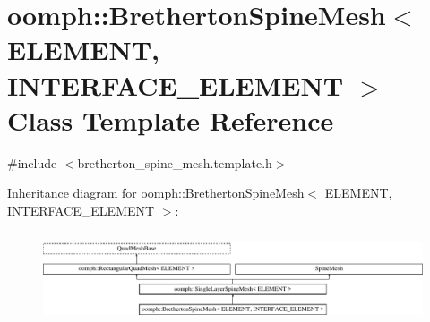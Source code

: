 \hypertarget{classoomph_1_1BrethertonSpineMesh}{}\section{oomph\+:\+:Bretherton\+Spine\+Mesh$<$ E\+L\+E\+M\+E\+NT, I\+N\+T\+E\+R\+F\+A\+C\+E\+\_\+\+E\+L\+E\+M\+E\+NT $>$ Class Template Reference}
\label{classoomph_1_1BrethertonSpineMesh}


{\ttfamily \#include $<$bretherton\+\_\+spine\+\_\+mesh.\+template.\+h$>$}

Inheritance diagram for oomph\+:\+:Bretherton\+Spine\+Mesh$<$ E\+L\+E\+M\+E\+NT, I\+N\+T\+E\+R\+F\+A\+C\+E\+\_\+\+E\+L\+E\+M\+E\+NT $>$\+:\begin{figure}[H]
\begin{center}
\leavevmode
\includegraphics[height=2.731707cm]{classoomph_1_1BrethertonSpineMesh}
\end{center}
\end{figure}
